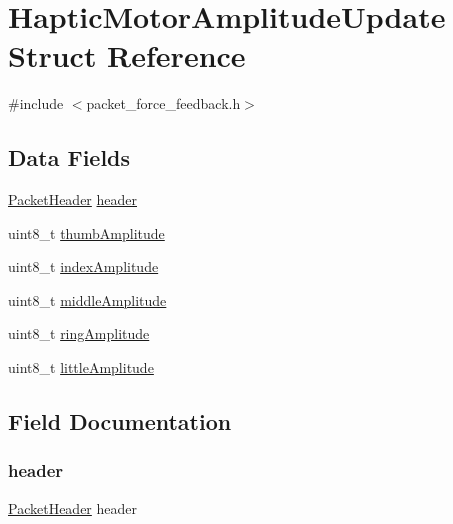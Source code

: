 \hypertarget{struct_haptic_motor_amplitude_update}{}\section{Haptic\+Motor\+Amplitude\+Update Struct Reference}
\label{struct_haptic_motor_amplitude_update}


{\ttfamily \#include $<$packet\+\_\+force\+\_\+feedback.\+h$>$}

\subsection*{Data Fields}
\begin{DoxyCompactItemize}
\item 
\hyperlink{struct_packet_header}{Packet\+Header} \hyperlink{struct_haptic_motor_amplitude_update_aaed6c168c58cb4f203b7f5623775d739}{header}
\item 
uint8\+\_\+t \hyperlink{struct_haptic_motor_amplitude_update_ad8b27777752714df0f39bf998079db76}{thumb\+Amplitude}
\item 
uint8\+\_\+t \hyperlink{struct_haptic_motor_amplitude_update_aadf86432f950d4067e4950f643bb81a3}{index\+Amplitude}
\item 
uint8\+\_\+t \hyperlink{struct_haptic_motor_amplitude_update_a51ab476e6b62d81ce340982ba5649705}{middle\+Amplitude}
\item 
uint8\+\_\+t \hyperlink{struct_haptic_motor_amplitude_update_a537b61c49ae587cce787eb44fdfdb4b8}{ring\+Amplitude}
\item 
uint8\+\_\+t \hyperlink{struct_haptic_motor_amplitude_update_ac1f4cb034ce77186a44f52375465406d}{little\+Amplitude}
\end{DoxyCompactItemize}


\subsection{Field Documentation}
\mbox{\label{struct_haptic_motor_amplitude_update_aaed6c168c58cb4f203b7f5623775d739}} 
\subsubsection{\texorpdfstring{header}{header}}
{\footnotesize\ttfamily \hyperlink{struct_packet_header}{Packet\+Header} header}

